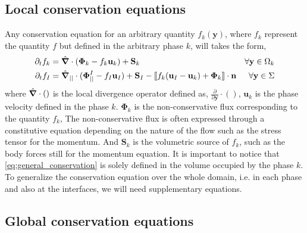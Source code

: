 \subsection{Local conservation equations}
Any conservation equation for an arbitrary quantity $f_k(\textbf{y})$, where $f_k$ represent the quantity $f$ but defined in the arbitrary phase $k$, will takes the form,
\begin{align}
    \label{eq:general_conservation}
    \partial_t f_k
    &= \hat{\bm{\nabla}} \cdot \left(
        \bm{\Phi}_k
        - f_k\textbf{u}_k
        \right)
    + \textbf{S}_k
    & \forall \textbf{y} \in \Omega_k&\\
    \partial_t f_I  
    &= 
    \hat{\bm{\nabla}}_{||} \cdot (\mathbf{\Phi}_{||}^I - f_I \textbf{u}_I)
    + \textbf{S}_I
    - \llbracket 
        f_k (\textbf{u}_I - \textbf{u}_k)
        + \mathbf{\Phi}_k
      \rrbracket \cdot \textbf{n} 
    & \forall \textbf{y} \in \Sigma&
    \label{eq:dt_f_I}
\end{align}
where $\hat{\bm{\nabla}}\cdot()$ is the local divergence operator defined as, $\frac{\partial}{\partial \textbf{y}}\cdot()$, $\textbf{u}_k$ is the phase velocity defined in the phase $k$.
$\bm{\Phi}_k$ is the non-conservative flux corresponding to the quantity $f_k$,
The non-conservative flux is often expressed through a constitutive equation depending on the nature of the flow such as the stress tensor for the momentum.
And $\textbf{S}_k$ is the volumetric source of $f_k$, such as the body forces still for the momentum equation.
It is important to notice that \ref{eq:general_conservation} is solely defined in the volume occupied by the phase $k$.
To generalize the conservation equation over the whole domain, i.e. in each phase and also at the interfaces, we will need supplementary equations.


\subsection{Global conservation equations}

